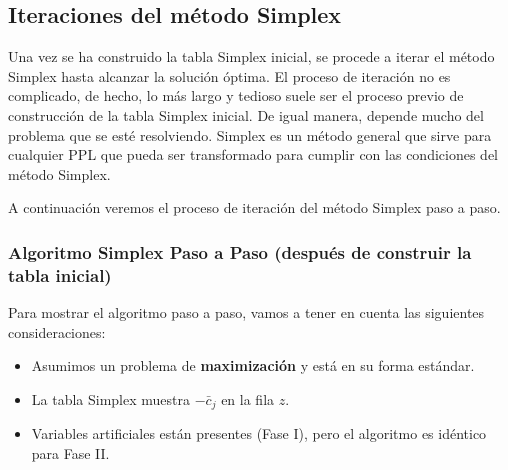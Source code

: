\subsection{Iteraciones del método Simplex}
\label{sec:iteraciones_simplex}

Una vez se ha construido la tabla Simplex inicial, se procede a iterar el método Simplex hasta alcanzar la solución óptima. El proceso de iteración no es complicado, de hecho, lo más largo y tedioso suele ser el proceso previo de construcción de la tabla Simplex inicial. De igual manera, depende mucho del problema que se esté resolviendo. Simplex es un método general que sirve para cualquier PPL que pueda ser transformado para cumplir con las condiciones del método Simplex.

A continuación veremos el proceso de iteración del método Simplex paso a paso.

\subsubsection{Algoritmo Simplex Paso a Paso (después de construir la tabla inicial)}
Para mostrar el algoritmo paso a paso, vamos a tener en cuenta las siguientes consideraciones:
\begin{itemize}
  \item Asumimos un problema de \textbf{maximización} y está en su forma estándar.
  \item La tabla Simplex muestra \(-\bar{c}_j\) en la fila \(z\).
  \item Variables artificiales están presentes (Fase I), pero el algoritmo es idéntico para Fase II.
\end{itemize}

